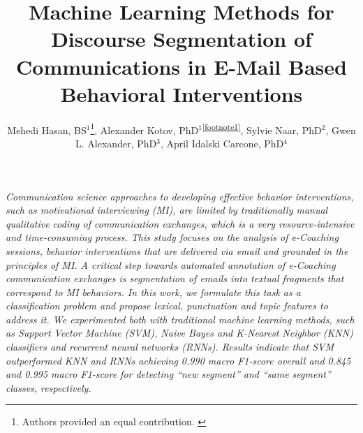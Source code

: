 \documentclass{amia}
\begin{document}
\title{Machine Learning Methods for Discourse Segmentation of Communications in E-Mail Based Behavioral Interventions}

\author{Mehedi Hasan, BS$^{1}$\footnote[1]{Authors provided an equal contribution. \label{footnote1}}, Alexander Kotov, PhD$^{1}$\textsuperscript{\ref{footnote1}}, Sylvie Naar, PhD$^{2}$, Gwen L. Alexander, PhD$^{3}$, April Idalski Carcone, PhD$^{4}$}


\maketitle

\textit{Communication science approaches to developing effective behavior interventions, such as motivational interviewing (MI), are limited by traditionally manual qualitative coding of communication exchanges, which is a very resource-intensive and time-consuming process. This study focuses on the analysis of e-Coaching sessions, behavior interventions that are delivered via email and grounded in the principles of MI. A critical step towards automated annotation of e-Coaching communication exchanges is segmentation of emails into textual fragments that correspond to MI behaviors. In this work, we formulate this task as a classification problem and propose lexical, punctuation and topic features to address it. We experimented both with traditional machine learning methods, such as Support Vector Machine (SVM), Naive Bayes and K-Nearest Neighbor (KNN) classifiers and recurrent neural networks (RNNs). Results indicate that SVM outperformed KNN and RNNs achieving 0.990 macro F1-score overall and 0.845 and 0.995 macro F1-score for detecting ``new segment'' and ``same segment'' classes, respectively.}
\end{document}
